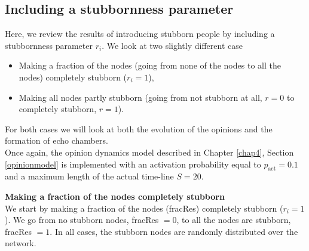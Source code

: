 \documentclass[11 pt , letterpaper , twoside , openright]{book}
\begin{document}
\subsection{Including a stubbornness parameter}
\label{stubbpar}
Here, we review the results of introducing stubborn people by including a stubbornness parameter $r_i$. We look at two slightly different case
\begin{itemize}
	\item Making a fraction of the nodes (going from none of the nodes to all the nodes) completely stubborn ($r_i = 1$),
	\item Making all nodes partly stubborn (going from not stubborn at all, $r = 0$ to completely stubborn, $r = 1$).
\end{itemize}
For both cases we will look at both the evolution of the opinions and the formation of echo chambers. \\
Once again, the opinion dynamics model described in Chapter \ref{chap4}, Section \ref{opinionmodel} is implemented with an activation probability equal to $p_{\text{act}} = 0.1$ and a maximum length of the actual time-line $S = 20$.

\newpage
\noindent
\textbf{Making a fraction of the nodes completely stubborn}\\
\newline
We start by making a fraction of the nodes (fracRes) completely stubborn ($r_i = 1$). We go from no stubborn nodes, fracRes $=0$, to all the nodes are stubborn, fracRes $=1$. In all cases, the stubborn nodes are randomly distributed over the network.\\
\end{document}
